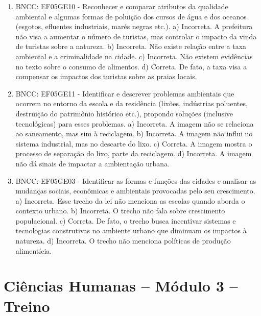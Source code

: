 \begin{enumerate}
\item
BNCC: EF05GE10 - Reconhecer e comparar atributos da qualidade ambiental e algumas formas de poluição dos cursos de água e dos oceanos (esgotos,
efluentes industriais, marés negras etc.).
a) Incorreta. A prefeitura não visa a aumentar o número de turistas, mas
controlar o impacto da vinda de turistas sobre a natureza.
b) Incorreta. Não existe relação entre a taxa ambiental e a
criminalidade na cidade.
c) Incorreta. Não existem evidências no texto sobre o consumo de
alimentos.
d) Correta. De fato, a taxa visa a compensar os impactos dos turistas
sobre as praias locais.

\item
BNCC: EF05GE11 - Identificar e descrever problemas ambientais que ocorrem no
entorno da escola e da residência (lixões, indústrias poluentes,
destruição do patrimônio histórico etc.), propondo soluções (inclusive
tecnológicas) para esses problemas.
a) Incorreta. A imagem não se relaciona ao saneamento, mas sim à
reciclagem.
b) Incorreta. A imagem não influi no sistema industrial, mas no descarte
do lixo.
c) Correta. A imagem mostra o processo de separação do lixo, parte da
reciclagem.
d) Incorreta. A imagem não dá sinais de impactar a ambientação urbana.

\item
BNCC: EF05GE03 - Identificar as formas e funções das cidades e
analisar as mudanças sociais, econômicas e ambientais provocadas pelo
seu crescimento.
a) Incorreta. Esse trecho da lei não menciona as escolas quando aborda o
contexto urbano.
b) Incorreta. O trecho não fala sobre crescimento populacional.
c) Correta. De fato, o trecho busca incentivar sistemas e tecnologias
construtivas no ambiente urbano que diminuam os impactos à natureza.
d) Incorreta. O trecho não menciona políticas de produção alimentícia.
\end{enumerate}

\section*{Ciências Humanas – Módulo 3 – Treino}

